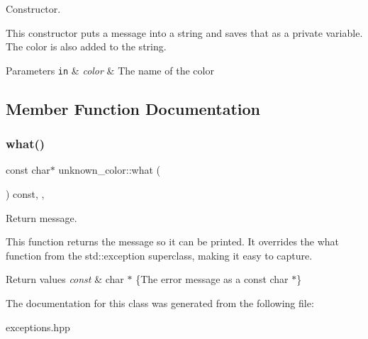Constructor. 

This constructor puts a message into a string and saves that as a private variable. The color is also added to the string.


\begin{DoxyParams}[1]{Parameters}
\mbox{\tt in}  & {\em color} & The name of the color \\
\hline
\end{DoxyParams}


\subsection{Member Function Documentation}
\mbox{\label{classunknown__color_a3340e3af5b5f734727b73ddf25df3265}} 
\subsubsection{\texorpdfstring{what()}{what()}}
{\footnotesize\ttfamily const char$\ast$ unknown\+\_\+color\+::what (\begin{DoxyParamCaption}{ }\end{DoxyParamCaption}) const\hspace{0.3cm}{\ttfamily [inline]}, {\ttfamily [override]}, {\ttfamily [noexcept]}}



Return message. 

This function returns the message so it can be printed. It overrides the what function from the std\+::exception superclass, making it easy to capture.


\begin{DoxyRetVals}{Return values}
{\em const} & char $\ast$ \{The error message as a const char $\ast$\} \\
\hline
\end{DoxyRetVals}


The documentation for this class was generated from the following file\+:\begin{DoxyCompactItemize}
\item 
exceptions.\+hpp\end{DoxyCompactItemize}
